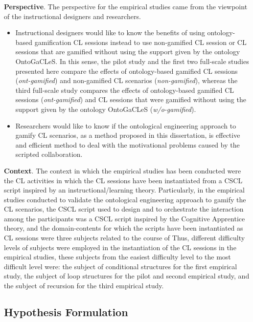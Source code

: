 \textbf{Perspective}. The perspective for the empirical studies came from the viewpoint of the instructional designers and researchers.

\begin{itemize}
\item
Instructional designers would like to know the benefits of using ontology-based gamification CL sessions instead to use non-gamified CL session or CL sessions that are gamified without using the support given by the ontology OntoGaCLeS. In this sense, the pilot study and the first two full-scale studies presented here compare the effects of ontology-based gamified CL sessions (\emph{ont-gamified}) and non-gamified CL scenarios (\emph{non-gamified}), whereas the third full-scale study compares the effects of ontology-based gamified CL sessions (\emph{ont-gamified}) and CL sessions that were gamified without using the support given by the ontology OntoGaCLeS (\emph{w/o-gamified}).

\item
Researchers would like to know if the ontological engineering approach to gamify CL scenarios, as a method proposed in this dissertation, is effective and efficient method to deal with the motivational problems caused by the scripted collaboration. 
\end{itemize}

\textbf{Context}. The context in which the empirical studies has been conducted were the CL activities in which the CL sessions have been instantiated from a CSCL script inspired by an instructional/learning theory. 
Particularly, in the empirical studies conducted to validate the ontological engineering approach to gamify the CL scenarios, the CSCL script used to design and to orchestrate the interaction among the participants was a CSCL script inspired by the Cognitive Apprentice theory, and the domain-contents for which the scripts have been instantiated as CL sessions were three subjects related to the course of  Thus, different difficulty levels of subjects were employed in the instantiation of the CL sessions in the empirical studies, these subjects from the easiest difficulty level to the most difficult level were: the subject of conditional structures for the first empirical study, the subject of loop structures for the pilot and second empirical study, and the subject of recursion for the third empirical study.


\subsection{Hypothesis Formulation}

